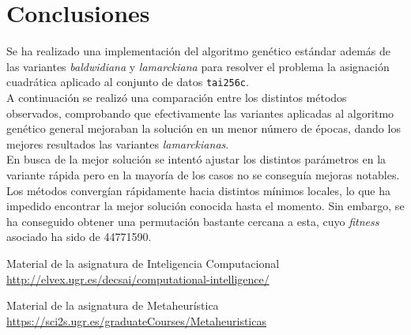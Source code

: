 \section{Conclusiones}

Se ha realizado una implementación del algoritmo genético estándar además de las variantes \textit{baldwidiana} y \textit{lamarckiana} para resolver el problema la asignación cuadrática aplicado al conjunto de datos \texttt{tai256c}.\\

A continuación se realizó una comparación entre los distintos métodos observados, comprobando que efectivamente las variantes aplicadas al algoritmo genético general mejoraban la solución en un menor número de épocas, dando los mejores resultados las variantes \textit{lamarckianas}. \\

En busca de la mejor solución se intentó ajustar los distintos parámetros en la variante rápida pero en la mayoría de los casos no se conseguía mejoras notables. \\

Los métodos convergían rápidamente hacia distintos mínimos locales, lo que ha impedido encontrar la mejor solución conocida hasta el momento. Sin embargo, se ha conseguido obtener una permutación bastante cercana a esta, cuyo \textit{fitness} asociado ha sido de 44771590.


\newpage


\begin{thebibliography}{99} %


	 Material de la asignatura de Inteligencia Computacional\\
		\url{http://elvex.ugr.es/decsai/computational-intelligence/}
	
	 Material de la asignatura de Metaheurística\\
		\url{https://sci2s.ugr.es/graduateCourses/Metaheuristicas}
			
		
	
\end{thebibliography}


